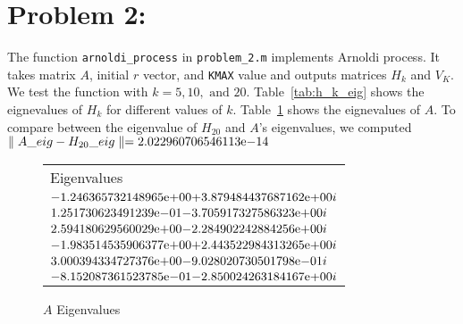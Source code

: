 \newpage
\section*{Problem 2:}

The function \texttt{arnoldi\_process} in \texttt{problem\_2.m} implements Arnoldi process. It takes matrix $A$, initial $r$ vector, and \texttt{KMAX} value and outputs matrices $H_{k}$ and $V_{K}$. We test the function with $k=5, 10, \text{\ and\ }20$. Table~\ref{tab:h_k_eig} shows the eignevalues of $H_{k}$ for different values of $k$. Table~\ref{tab:a_eig} shows the eignevalues of $A$. To compare between the eigenvalue of $H_{20}$ and $A$'s eigenvalues, we computed $\parallel A\_eig - H_{20}\_eig\parallel ={2.022960706546113}\mathrm{e}{-14}$

\begin{figure}[!tbh]
 \centering    
\begin{tabular}{ ||p{10cm}|}
\hline
 Eigenvalues \\ \hhline{|=|}   
\hline
${-1.246365732148965}\mathrm{e}{+00}   {+ 3.879484437687162}\mathrm{e}{+00i}$\\
${ 1.251730623491239}\mathrm{e}{-01}   {- 3.705917327586323}\mathrm{e}{+00i}$\\
${ 2.594180629560029}\mathrm{e}{+00}   {- 2.284902242884256}\mathrm{e}{+00i}$\\
${-1.983514535906377}\mathrm{e}{+00}   {+ 2.443522984313265}\mathrm{e}{+00i}$\\
${ 3.000394334727376}\mathrm{e}{+00}   {- 9.028020730501798}\mathrm{e}{-01i}$\\  
${-8.152087361523785}\mathrm{e}{-01}   {- 2.850024263184167}\mathrm{e}{+00i}$\\  
\hline  
\end{tabular} 
\caption{$A$ Eigenvalues}
   \label{tab:a_eig}
\end{figure} 


